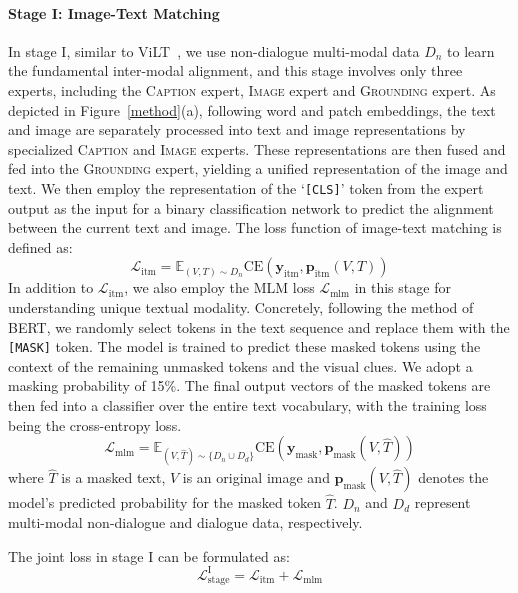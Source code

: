 \documentclass[11pt]{article}
\begin{document}
\paragraph{Stage I: Image-Text Matching}
In stage I, similar to ViLT~\citep{kim2021vilt}, we use non-dialogue multi-modal data $D_n$ to learn the fundamental inter-modal alignment, and this stage involves only three experts, including the \textsc{Caption} expert,  \textsc{Image} expert and  \textsc{Grounding} expert.
As depicted in Figure~\ref{method}(a), following word and patch embeddings, the text and image are separately processed into text and image representations by specialized \textsc{Caption} and \textsc{Image} experts. These representations are then fused and fed into the \textsc{Grounding} expert, yielding a unified representation of the image and text. We then employ the representation of the `\texttt{[CLS]}' token from the expert output as the input for a binary classification network to predict the alignment between the current text and image. The loss function of image-text matching is defined as:
\begin{equation}
\mathcal{L}_{\mathrm{itm}}=\mathbb{E}_{(V, T) \sim D_n} \mathrm{CE}\left(\boldsymbol{y}_{\mathrm{itm}}, \boldsymbol{p}_{\mathrm{itm}}(V, T)\right)
\end{equation}
In addition to $\mathcal{L}_{\mathrm{itm}}$, we also employ the MLM loss $\mathcal{L}_{\mathrm{mlm}}$ in this stage for  understanding unique textual modality.
Concretely, following the method of BERT, we randomly select tokens in the text sequence and replace them with the \texttt{[MASK]} token. The model is trained to predict these masked tokens using the context of the remaining unmasked tokens and the visual clues. We adopt a masking probability of 15\%. The final output vectors of the masked tokens are then fed into a classifier over the entire text vocabulary, with the training loss being the cross-entropy loss.
\begin{equation}
\mathcal{L}_{\mathrm{mlm}}=\mathbb{E}_{(V, \hat{T}) \sim {\{D_n \cup D_d\}}} \mathrm{CE}(\boldsymbol{y}_{\mathrm{mask}}, \boldsymbol{p}_{\mathrm{mask}}(V, \hat{T}))
\end{equation}
where $\hat{T}$ is a masked text, $V$ is an original image and $\boldsymbol{p}_{\mathrm{mask}}(V, \hat{T})$ denotes the model's predicted probability for the masked token $\hat{T}$. 
$D_n$ and $D_d$ represent multi-modal non-dialogue and dialogue data, respectively.

The joint loss in stage I can be formulated as:
\begin{equation}
\mathcal{L}_{\mathrm{stage}}^{\mathrm{I}} = \mathcal{L}_{\mathrm{itm}} + \mathcal{L}_{\mathrm{mlm}}
\end{equation}
\end{document}
